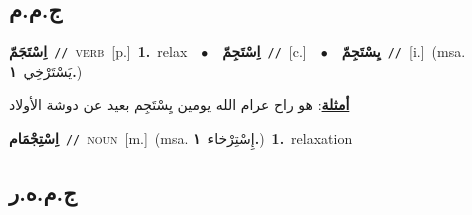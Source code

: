 \documentclass[10pt,a4paper,twoside]{article} %
\begin{document}
\begin{multicols}{2}
\vspace{-3mm}
\subsection*{\color{blue}\foreignlanguage{arabic}{ج.م.م}\color{blue}{}} 

{\setlength\topsep{0pt}\textbf{\foreignlanguage{arabic}{اِسْتَجَمّ}}\ {\color{gray}\texttt{//}\color{black}}\ \textsc{verb}\ [p.]\ \textbf{1.}~relax\ \ $\bullet$\ \ \setlength\topsep{0pt}\textbf{\foreignlanguage{arabic}{اِسْتَجِمّ}}\ {\color{gray}\texttt{//}\color{black}}\ [c.]\ \ $\bullet$\ \ \setlength\topsep{0pt}\textbf{\foreignlanguage{arabic}{يِسْتَجِمّ}}\ {\color{gray}\texttt{//}\color{black}}\ [i.]\ \color{gray}(msa. \foreignlanguage{arabic}{يَسْتَرْخِي}~\foreignlanguage{arabic}{\textbf{١.}})\color{black}\  \begin{flushright}\color{gray}\foreignlanguage{arabic}{\textbf{\underline{\foreignlanguage{arabic}{أمثلة}}}: هو راح عرام الله يومين يِسْتَجِم بعيد عن دوشة الأولاد}\end{flushright}\color{black}} \vspace{2mm}

{\setlength\topsep{0pt}\textbf{\foreignlanguage{arabic}{اِسْتِجْمَام}}\ {\color{gray}\texttt{//}\color{black}}\ \textsc{noun}\ [m.]\ \color{gray}(msa. \foreignlanguage{arabic}{إِسْتِرْخاء}~\foreignlanguage{arabic}{\textbf{١.}})\color{black}\ \textbf{1.}~relaxation\ } \vspace{2mm}

\vspace{-3mm}
\subsection*{\color{blue}\foreignlanguage{arabic}{ج.م.ه.ر}\color{blue}{}} 


\end{multicols}
\end{document}
